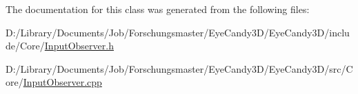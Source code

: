 The documentation for this class was generated from the following files\+:\begin{DoxyCompactItemize}
\item 
D\+:/\+Library/\+Documents/\+Job/\+Forschungsmaster/\+Eye\+Candy3\+D/\+Eye\+Candy3\+D/include/\+Core/\mbox{\hyperlink{_input_observer_8h}{Input\+Observer.\+h}}\item 
D\+:/\+Library/\+Documents/\+Job/\+Forschungsmaster/\+Eye\+Candy3\+D/\+Eye\+Candy3\+D/src/\+Core/\mbox{\hyperlink{_input_observer_8cpp}{Input\+Observer.\+cpp}}\end{DoxyCompactItemize}

